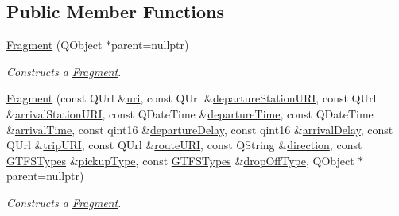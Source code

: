 \subsection*{Public Member Functions}
\begin{DoxyCompactItemize}
\item 
\mbox{\hyperlink{classQRail_1_1Fragments_1_1Fragment_ac973f9f8cc5f7cc3ba452765741de9de}{Fragment}} (Q\+Object $\ast$parent=nullptr)
\begin{DoxyCompactList}\small\item\em Constructs a \mbox{\hyperlink{classQRail_1_1Fragments_1_1Fragment}{Fragment}}. \end{DoxyCompactList}\item 
\mbox{\hyperlink{classQRail_1_1Fragments_1_1Fragment_a6b9960c74ce3256f2e479d8842d34562}{Fragment}} (const Q\+Url \&\mbox{\hyperlink{classQRail_1_1Fragments_1_1Fragment_ae5f38f826040cb216e345ce6eb26ebb6}{uri}}, const Q\+Url \&\mbox{\hyperlink{classQRail_1_1Fragments_1_1Fragment_a5b64058868e96c5ca56b91405ca51683}{departure\+Station\+U\+RI}}, const Q\+Url \&\mbox{\hyperlink{classQRail_1_1Fragments_1_1Fragment_a196eaba03a9dd9751a011e30a1e37dd4}{arrival\+Station\+U\+RI}}, const Q\+Date\+Time \&\mbox{\hyperlink{classQRail_1_1Fragments_1_1Fragment_a95d2c99a166573817bd8d8aa8b688b5e}{departure\+Time}}, const Q\+Date\+Time \&\mbox{\hyperlink{classQRail_1_1Fragments_1_1Fragment_ae8b17e8f7219d6252ffffcd4e20e7a35}{arrival\+Time}}, const qint16 \&\mbox{\hyperlink{classQRail_1_1Fragments_1_1Fragment_aa0e43583b4d64c688f5fa7e9b13b0855}{departure\+Delay}}, const qint16 \&\mbox{\hyperlink{classQRail_1_1Fragments_1_1Fragment_a0f5ee06943c6cf1dc3ba0e98439e4262}{arrival\+Delay}}, const Q\+Url \&\mbox{\hyperlink{classQRail_1_1Fragments_1_1Fragment_a0aab02000bd98face5322e427ffaa581}{trip\+U\+RI}}, const Q\+Url \&\mbox{\hyperlink{classQRail_1_1Fragments_1_1Fragment_a9313e0c67c93f2e7482071054c005dae}{route\+U\+RI}}, const Q\+String \&\mbox{\hyperlink{classQRail_1_1Fragments_1_1Fragment_a245aaaea9da4258cba1fa53335b05546}{direction}}, const \mbox{\hyperlink{classQRail_1_1Fragments_1_1Fragment_ae3c308ba6dec16f36ecc5dba59f35af3}{G\+T\+F\+S\+Types}} \&\mbox{\hyperlink{classQRail_1_1Fragments_1_1Fragment_afbddff790b1d207eff7adafba09f6e7c}{pickup\+Type}}, const \mbox{\hyperlink{classQRail_1_1Fragments_1_1Fragment_ae3c308ba6dec16f36ecc5dba59f35af3}{G\+T\+F\+S\+Types}} \&\mbox{\hyperlink{classQRail_1_1Fragments_1_1Fragment_a8cb44b415a121dfa2b0c6046df4bea27}{drop\+Off\+Type}}, Q\+Object $\ast$parent=nullptr)
\begin{DoxyCompactList}\small\item\em Constructs a \mbox{\hyperlink{classQRail_1_1Fragments_1_1Fragment}{Fragment}}. \end{DoxyCompactList}\item 

\end{DoxyCompactItemize}
